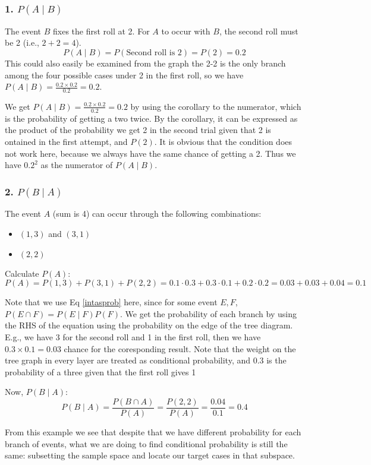\begin{solution}
    \subsubsection*{1. \( P(A \mid B) \)}
    The event \( B \) fixes the first roll at 2. For \( A \) to occur with \( B \), the second roll must be 2 (i.e., \( 2 + 2 = 4 \)).
    \[ P(A \mid B) = P(\text{Second roll is 2}) = P(2) = 0.2 \]
    This could also easily be examined from the graph the 2-2 is the only branch among the four possible cases under 2 in the first roll, so we have $P(A \mid B) = \frac{0.2\times 0.2}{0.2}=0.2$.
    \begin{remark}
        We get $P(A \mid B) = \frac{0.2\times 0.2}{0.2}=0.2$ by using the corollary to the numerator, which is the probability of getting a two twice. 
        By the corollary, it can be expressed as the product of the probability we get 2 in the second trial given that 2 is ontained in the first attempt, and $P(2)$.
        It is obvious that the condition does not work here, because we always have the same chance of getting a 2. Thus we have $0.2^2$ as the numerator of $P(A \mid B)$.
    \end{remark}
    \subsubsection*{2. \( P(B \mid A) \)}
    The event \( A \) (sum is 4) can occur through the following combinations:
    \begin{itemize}
        \item \( (1, 3) \) and \( (3, 1) \)
        \item \( (2, 2) \)
    \end{itemize}
    
    Calculate \( P(A) \):
    \[ P(A) = P(1, 3) + P(3, 1) + P(2, 2) = 0.1 \cdot 0.3 + 0.3 \cdot 0.1 + 0.2 \cdot 0.2 = 0.03 + 0.03 + 0.04 = 0.1 \]
    \begin{remark}
        Note that we use Eq \ref{intasprob} here, since for some event $E,F$, $P(E\cap F) = P(E \mid F)P(F)$.
        We get the probability of each branch by using the RHS of the equation using the probability on the edge of the tree 
        diagram. E.g., we have 3 for the second roll and 1 in the first roll, then we have $0.3\times 0.1 = 0.03$ chance for the coresponding result.
        Note that the weight on the tree graph in every layer are treated as conditional probability, and 0.3 is the probability of a three given that the first roll gives 1
    \end{remark}
    Now, \( P(B \mid A) \):
    \[ P(B \mid A) = \frac{P(B \cap A)}{P(A)} = \frac{P(2, 2)}{P(A)} = \frac{0.04}{0.1} = 0.4 \]
    
 From this example we see that despite that we have different probability for each branch of events, what we are doing to find conditional probability is still the same:
 subsetting the sample space and locate our target cases in that subspace.
\end{solution}

